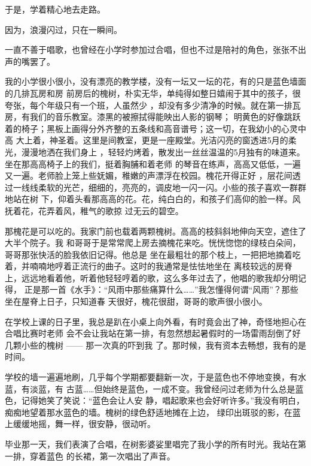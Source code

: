\documentclass[12pt,a4paper]{article}
\begin{document}
		于是，学着精心地去走路。

		因为，浪漫闪过，只在一瞬间。

	\endwriting



		一直不善于唱歌，也曾经在小学时参加过合唱，但也不过是陪衬的角色，张张不出声的嘴罢了。

		我的小学很小很小，没有漂亮的教学楼，没有一坛又一坛的花，有的只是蓝色墙面的几排瓦房和房
	前房后的槐树，朴实无华，单纯得如整日嬉闹于其中的孩子，很夸张，每个年级只有一个班，人虽然少
	，却没有多少清净的时候。就在第一排瓦房，有我们的音乐教室。漆黑的被擦拭得能映出人影的钢琴；
	明黄色的好像跳跃着的椅子；黑板上画得分外齐整的五条线和高音谱号；这一切，在我幼小的心灵中高
	大上着，神圣着。这里是间教室，更是一座殿堂。光洁闪亮的窗透进5月的柔光，漫漫地洒在我们身上
	，轻轻灼烤着，散发出一丝丝温温的5月独有的味道来。坐在那高高椅子上的我们，挺着胸脯和着老师
	的琴音在练声，高高又低低，一遍又一遍。老师脸上笼上些妩媚，稚嫩的声漂浮在校园。槐花开得正好
	，层花间透过一线线柔软的光芒，细细的，亮亮的，调皮地一闪一闪。小些的孩子喜欢一群群地站在树
	下，仰着头看那高高的花。花，纯白白的，和孩子们高仰的脸一样。风抚着花，花弄着风，稚气的歌掠
	过无云的碧空。

		那槐花是可以吃的。我家门前也载着两颗槐树。高高的枝斜斜地伸向天空，遮住了大半个院子。我
	和哥哥于是常常爬上房去摘槐花来吃。恍恍惚惚的绿枝白朵间，哥哥那张快活的脸我依旧记得。他总是
	坐在最粗壮的那个枝上，一把把地摘着吃着，并喃喃地哼着正流行的曲子。这时的我通常是怯怯地坐在
	离枝较远的房脊上，远远地看着他，听着他轻轻哼着的歌，这么多年过去了，他唱的歌我却分明记得，
	正是那一首《水手》：“风雨中那些痛算什么……”我怎懂得何谓“风雨”？那些坐在屋脊上日子，只知道春
	天很好，槐花很甜，哥哥的歌声很小很小。

		在学校上课的日子里，我总是趴在小桌上向外看，有时竟会出了神，奇怪地担心在合唱比赛时老师
	会不会让我站在第一排，有忽然想起暑假时的一场雷雨刮倒了好几颗小些的槐树 —— 那一次真的吓到我
	了。那时候，我有资本去畅想，我有的是时间。

		学校的墙一遍遍地刷，几乎每个学期都要翻新一次，于是蓝色也不停地变换，有水蓝，有淡蓝，有
	古蓝……但始终是蓝色，一成不变。我曾经问过老师为什么总是蓝色，记得她笑了笑说：“蓝色会让人安
	静，唱起歌来也会好听许多。”我没有明白，痴痴地望着那水蓝色的墙。槐树的绿色舒适地摊在上边，
	绿印出斑驳的影，在蓝上缓缓地摇，舞一样，很安静，很动听。

		毕业那一天，我们表演了合唱，在树影婆娑里唱完了我小学的所有时光。我站在第一排，穿着蓝色
	的长裙，第一次唱出了声音。
\end{document}
